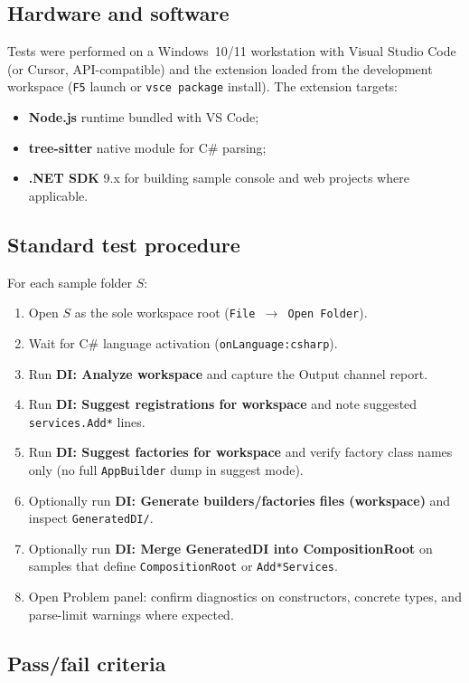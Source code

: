 \subsection{Hardware and software}

Tests were performed on a Windows~10/11 workstation with Visual Studio Code (or Cursor, API-compatible) and the extension loaded from the development workspace (\texttt{F5} launch or \texttt{vsce package} install). The extension targets:
\begin{itemize}
	\item \textbf{Node.js} runtime bundled with VS Code;
	\item \textbf{tree-sitter} native module for C\# parsing;
	\item \textbf{.NET SDK} 9.x for building sample console and web projects where applicable.
\end{itemize}

\subsection{Standard test procedure}

For each sample folder \(S\):
\begin{enumerate}
	\item Open \(S\) as the sole workspace root (\texttt{File $\rightarrow$ Open Folder}).
	\item Wait for C\# language activation (\texttt{onLanguage:csharp}).
	\item Run \textbf{DI: Analyze workspace} and capture the Output channel report.
	\item Run \textbf{DI: Suggest registrations for workspace} and note suggested \texttt{services.Add*} lines.
	\item Run \textbf{DI: Suggest factories for workspace} and verify factory class names only (no full \texttt{AppBuilder} dump in suggest mode).
	\item Optionally run \textbf{DI: Generate builders/factories files (workspace)} and inspect \texttt{GeneratedDI/}.
	\item Optionally run \textbf{DI: Merge GeneratedDI into CompositionRoot} on samples that define \texttt{CompositionRoot} or \texttt{Add*Services}.
	\item Open Problem panel: confirm diagnostics on constructors, concrete types, and parse-limit warnings where expected.
\end{enumerate}

\subsection{Pass/fail criteria}

